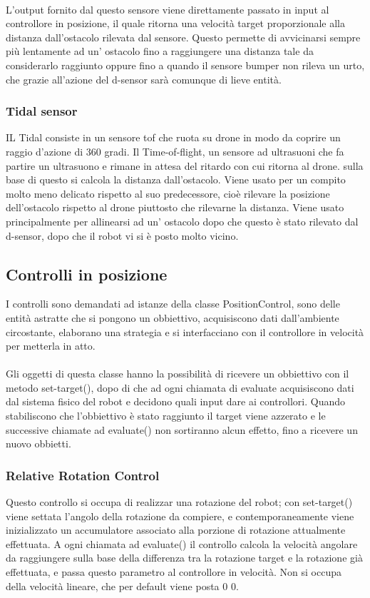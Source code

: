 \documentclass{article}
\begin{document}
\paragraph{}
L'output fornito dal questo sensore viene direttamente passato in input al controllore in posizione, il quale ritorna una velocità target proporzionale alla distanza dall'ostacolo rilevata dal sensore. Questo permette di avvicinarsi sempre più lentamente ad un' ostacolo fino a raggiungere una distanza tale da considerarlo raggiunto oppure fino a quando il sensore bumper non rileva un urto, che grazie all'azione del d-sensor sarà comunque di lieve entità.

\subsubsection{Tidal sensor}
IL Tidal consiste in un sensore tof che ruota su drone in modo da coprire un raggio d'azione di 360 gradi. Il Time-of-flight, un sensore ad ultrasuoni che fa partire un ultrasuono e rimane in attesa del ritardo con cui ritorna al drone. sulla base di questo si calcola la distanza dall'ostacolo. Viene usato per un compito molto meno delicato rispetto al suo predecessore, cioè rilevare la posizione dell'ostacolo rispetto al drone piuttosto che rilevarne la distanza. Viene usato principalmente per allinearsi ad un' ostacolo dopo che questo è stato rilevato dal d-sensor, dopo che il robot vi si è posto molto vicino.

\subsection{Controlli in posizione}
I controlli sono demandati ad istanze della classe PositionControl, sono delle entità astratte che si pongono un obbiettivo, acquisiscono dati dall'ambiente circostante, elaborano una strategia e si interfacciano con il controllore in velocità per metterla in atto.
\paragraph{}
Gli oggetti di questa classe hanno la possibilità di ricevere un obbiettivo con il metodo set-target(), dopo di che ad ogni chiamata di evaluate acquisiscono dati dal sistema fisico del robot e decidono quali input dare ai controllori. Quando stabiliscono che l'obbiettivo è stato raggiunto il target viene azzerato e le successive chiamate ad evaluate() non sortiranno alcun effetto, fino a ricevere un nuovo obbietti.
\subsubsection{Relative Rotation Control}
Questo controllo si occupa di realizzar una rotazione del robot; con set-target() viene settata l'angolo della rotazione da compiere, e contemporaneamente viene inizializzato un accumulatore associato alla porzione di rotazione attualmente effettuata. A ogni chiamata ad evaluate() il controllo calcola la velocità angolare da raggiungere sulla base della differenza tra la rotazione target e la rotazione già effettuata, e passa questo parametro al controllore in velocità. Non si occupa della velocità lineare, che per default viene posta 0 0.
\end{document}

